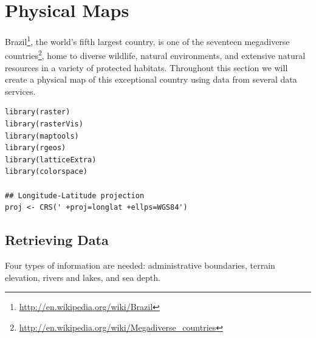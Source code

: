 
\section{Physical Maps}
\label{sec-1}
Brazil\footnote{\url{http://en.wikipedia.org/wiki/Brazil}}, the world's fifth largest country, is one of the
seventeen megadiverse countries\footnote{\url{http://en.wikipedia.org/wiki/Megadiverse_countries}}, home to diverse wildlife,
natural environments, and extensive natural resources in a variety of
protected habitats. Throughout this section we will create a physical
map of this exceptional country using data from several data services.


\lstset{language=R,numbers=none}
\begin{lstlisting}
library(raster)
library(rasterVis)
library(maptools)
library(rgeos)
library(latticeExtra)
library(colorspace)

## Longitude-Latitude projection
proj <- CRS(' +proj=longlat +ellps=WGS84')
\end{lstlisting}

\subsection{Retrieving Data}
\label{sec-1-1}
Four types of information are needed: administrative boundaries,
terrain elevation, rivers and lakes, and sea depth.


